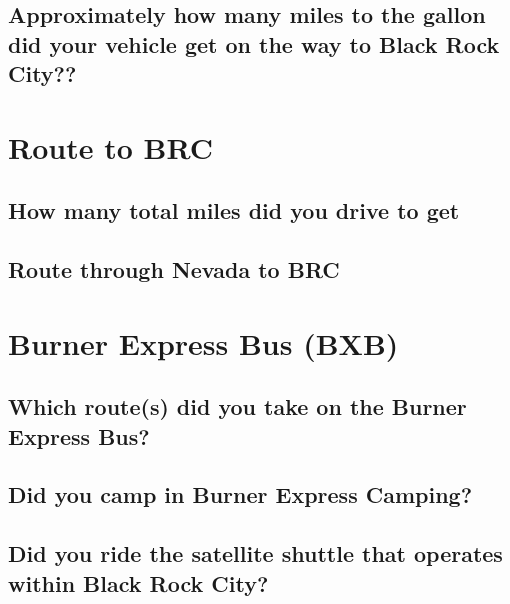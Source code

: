 \documentclass[
]{book}
\begin{document}
\hypertarget{approximately-how-many-miles-to-the-gallon-did-your-vehicle-get-on-the-way-to-black-rock-city}{%
\subsection{Approximately how many miles to the gallon did your vehicle get on the way to Black Rock City??}\label{approximately-how-many-miles-to-the-gallon-did-your-vehicle-get-on-the-way-to-black-rock-city}}

\hypertarget{route-to-brc}{%
\section{Route to BRC}\label{route-to-brc}}

\hypertarget{how-many-total-miles-did-you-drive-to-get}{%
\subsection{How many total miles did you drive to get}\label{how-many-total-miles-did-you-drive-to-get}}

\hypertarget{route-through-nevada-to-brc}{%
\subsection{Route through Nevada to BRC}\label{route-through-nevada-to-brc}}

\hypertarget{burner-express-bus-bxb}{%
\section{Burner Express Bus (BXB)}\label{burner-express-bus-bxb}}

\hypertarget{which-routes-did-you-take-on-the-burner-express-bus}{%
\subsection{Which route(s) did you take on the Burner Express Bus?}\label{which-routes-did-you-take-on-the-burner-express-bus}}

\hypertarget{did-you-camp-in-burner-express-camping}{%
\subsection{Did you camp in Burner Express Camping?}\label{did-you-camp-in-burner-express-camping}}

\hypertarget{did-you-ride-the-satellite-shuttle-that-operates-within-black-rock-city}{%
\subsection{Did you ride the satellite shuttle that operates within Black Rock City?}\label{did-you-ride-the-satellite-shuttle-that-operates-within-black-rock-city}}
\end{document}
